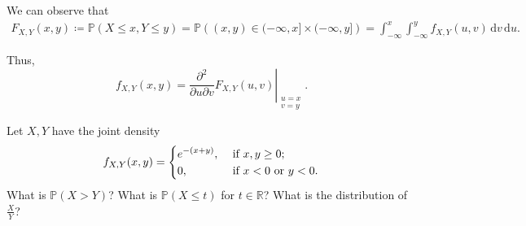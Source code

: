 We can observe that
\begin{align*}
    F_{X, Y}(x, y) \coloneqq \mathbb{P} (X \le x, Y \le y) = \mathbb{P} \left( (x, y) \in (-\infty, x] \times (-\infty , y] \right) = \int _{-\infty }^x \int _{-\infty }^y f_{X, Y}(u, v) \, \mathrm{d} v \, \mathrm{d} u.  
\end{align*}

Thus, 
\[
    f_{X, Y} (x, y) = \left. \frac{\partial^2}{\partial u \partial v} F_{X, Y}(u, v) \right\vert_{\substack{u = x \\ v = y}}.  
\]

\begin{eg}
    Let \(X, Y\) have the joint density 
    \[
        f_{X, Y} (x, y) = \begin{dcases}
            e^{-(x+y)}, &\text{ if } x, y \ge 0 ;\\
            0, &\text{ if } x < 0 \text{ or } y < 0 .
        \end{dcases}
    \] 
    What is \(\mathbb{P} (X > Y)\)? What is \(\mathbb{P} (X \le t)\) for \(t \in \mathbb{R}\)? What is the distribution of \(\frac{X}{Y}\)?    
\end{eg}


